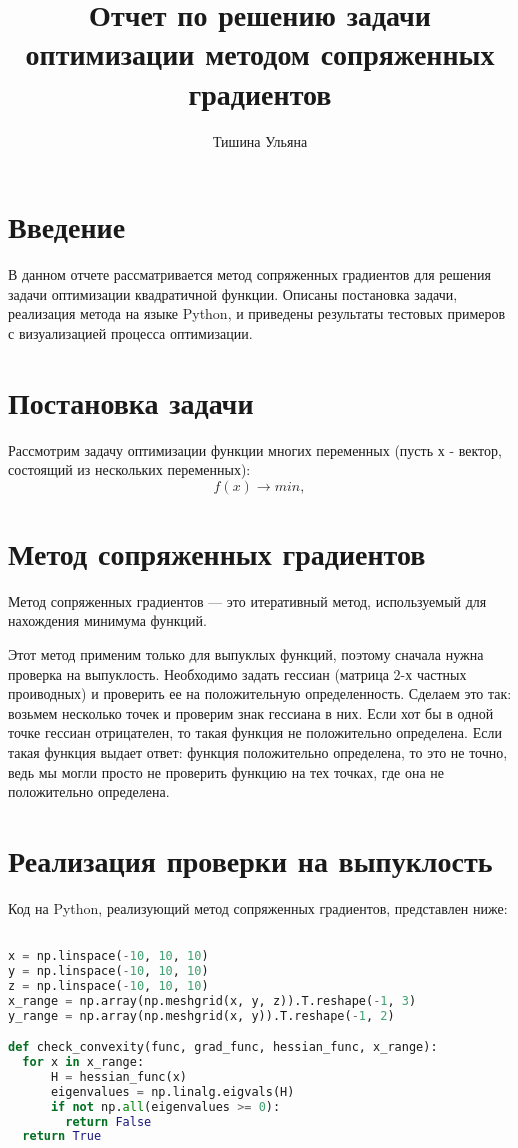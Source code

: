 \documentclass{article}
\title{Отчет по решению задачи оптимизации методом сопряженных градиентов}
\author{Тишина Ульяна}
\begin{document}
\maketitle

\newpage
\tableofcontents

\newpage
\section{Введение}
В данном отчете рассматривается метод сопряженных градиентов для решения задачи оптимизации квадратичной функции. Описаны постановка задачи, реализация метода на языке Python, и приведены результаты тестовых примеров с визуализацией процесса оптимизации.

\newpage
\section{Постановка задачи}
Рассмотрим задачу оптимизации функции многих переменных (пусть х - вектор, состоящий из нескольких переменных):
\begin{equation}
f(x)  \rightarrow min,
\end{equation}

\section{Метод сопряженных градиентов}
Метод сопряженных градиентов — это итеративный метод, используемый для нахождения минимума функций.

Этот метод применим только для выпуклых функций, поэтому сначала нужна проверка на выпуклость. Необходимо задать гессиан (матрица 2-х частных проиводных) и проверить ее на положительную определенность. Сделаем это так: возьмем несколько точек и проверим знак гессиана в них. Если хот бы в одной точке гессиан отрицателен, то такая функция не положительно определена. Если такая функция выдает ответ: функция положительно определена, то это не точно, ведь мы могли просто не проверить функцию на тех точках, где она не положительно определена.

\section{Реализация проверки на выпуклость}
Код на Python, реализующий метод сопряженных градиентов, представлен ниже:

\begin{lstlisting}[language=Python]

x = np.linspace(-10, 10, 10)
y = np.linspace(-10, 10, 10)
z = np.linspace(-10, 10, 10)
x_range = np.array(np.meshgrid(x, y, z)).T.reshape(-1, 3)
y_range = np.array(np.meshgrid(x, y)).T.reshape(-1, 2)

def check_convexity(func, grad_func, hessian_func, x_range):
  for x in x_range:
      H = hessian_func(x)
      eigenvalues = np.linalg.eigvals(H)
      if not np.all(eigenvalues >= 0):
        return False
  return True

\end{lstlisting}
\end{document}
